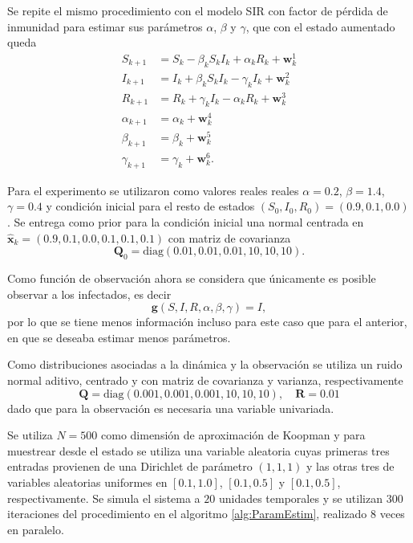 Se repite el mismo procedimiento con el modelo SIR con factor de pérdida de inmunidad para estimar sus parámetros $\alpha$, $\beta$ y $\gamma$, que con el estado aumentado queda
\begin{equation*}
    \begin{aligned}
        S_{k+1} &= S_k - \beta_k S_k I_k + \alpha_k R_k + \mathbf{w}_k^1 \\
        I_{k+1} &= I_k + \beta_k S_k I_k - \gamma_k I_k + \mathbf{w}_k^2 \\
        R_{k+1} &= R_k + \gamma_k I_k - \alpha_k R_k + \mathbf{w}_k^3 \\
        \alpha_{k+1} &= \alpha_k + \mathbf{w}_k^4 \\
        \beta_{k+1} &= \beta_k + \mathbf{w}_k^5 \\
        \gamma_{k+1} &= \gamma_k + \mathbf{w}_k^6.
    \end{aligned}
\end{equation*}

Para el experimento se utilizaron como valores reales reales $\alpha = 0.2$, $\beta = 1.4$, $\gamma = 0.4$ y condición inicial para el resto de estados $(S_0, I_0, R_0) = (0.9, 0.1, 0.0)$. Se entrega como prior para la condición inicial una normal centrada en $\hat{\mathbf{x}}_k = (0.9, 0.1, 0.0, 0.1, 0.1, 0.1)$ con matriz de covarianza
\[
\mathbf{Q}_0 = \text{diag}(0.01, 0.01, 0.01, 10, 10, 10).
\]

Como función de observación ahora se considera que únicamente es posible observar a los infectados, es decir
\[
\mathbf{g}(S, I, R, \alpha, \beta, \gamma) = I,
\]
por lo que se tiene menos información incluso para este caso que para el anterior, en que se deseaba estimar menos parámetros.

Como distribuciones asociadas a la dinámica y la observación se utiliza un ruido normal aditivo, centrado y con matriz de covarianza y varianza, respectivamente
\[
\mathbf{Q} = \text{diag}(0.001, 0.001, 0.001, 10, 10, 10), \quad \mathbf{R} = 0.01
\]
dado que para la observación es necesaria una variable univariada.

Se utiliza $N=500$ como dimensión de aproximación de Koopman y para muestrear desde el estado se utiliza una variable aleatoria cuyas primeras tres entradas provienen de una Dirichlet de parámetro $(1,1,1)$ y las otras tres de variables aleatorias uniformes en $[0.1, 1.0]$, $[0.1, 0.5]$ y $[0.1, 0.5]$, respectivamente. Se simula el sistema a $20$ unidades temporales y se utilizan $300$ iteraciones del procedimiento en el algoritmo \ref{alg:ParamEstim}, realizado $8$ veces en paralelo.

